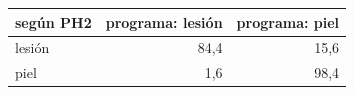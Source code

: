 \begin{tabular}{lrr}
\toprule
según PH2 & programa: lesión & programa: piel \\
\midrule
lesión & 84{,}4 & 15{,}6 \\
piel & 1{,}6 & 98{,}4 \\
\bottomrule
\end{tabular}
